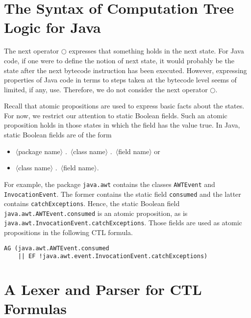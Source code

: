 \documentclass[12pt]{article}
\newcommand{\nxt}{\bigcirc}
\theoremstyle{definition}
\begin{document}
\section{The Syntax of Computation Tree Logic for Java}

The next operator $\nxt$ expresses that something holds in the next state.  For Java code, if one were to define the notion of next state, it would probably be the state after the next bytecode instruction has been executed.   However, expressing properties of Java code in terms to steps taken at the bytecode level seems of limited, if any, use.  Therefore, we do not consider the next operator $\nxt$.

Recall that atomic propositions are used to express basic facts about the states.  For now, we restrict our attention to static Boolean fields.  Such an atomic proposition holds in those states in which the field has the value true.  In Java, static Boolean fields are of the form 
\begin{itemize}
\item 
$\langle$package name$\rangle$ .\ $\langle$class name$\rangle$ .\ $\langle$field name$\rangle$ or
\item
$\langle$class name$\rangle$ .\ $\langle$field name$\rangle$.
\end{itemize}
For example, the package \lstinline{java.awt} contains the classes \lstinline{AWTEvent} and \lstinline{InvocationEvent}.  The former contains the static field \lstinline{consumed} and the latter contains \lstinline{catchExceptions}.  Hence, the static Boolean field \lstinline{java.awt.AWTEvent.consumed} is an atomic proposition, as is \lstinline{java.awt.InvocationEvent.catchExceptions}.  Those fields are used as atomic propositions in the following CTL formula.
\begin{lstlisting}
AG (java.awt.AWTEvent.consumed 
    || EF !java.awt.event.InvocationEvent.catchExceptions)
\end{lstlisting}

\section{A Lexer and Parser for CTL Formulas}
\end{document}
